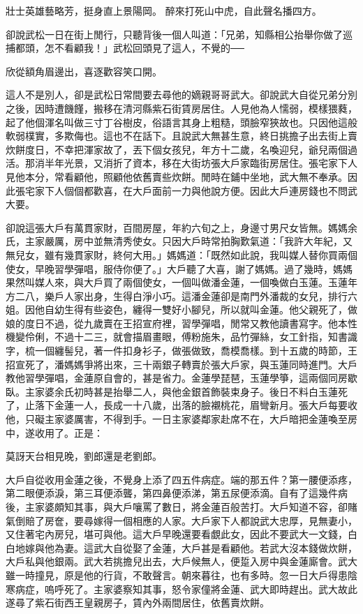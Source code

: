 \begin{showcontents}{}
壯士英雄藝略芳，挺身直上景陽岡。
醉來打死山中虎，自此聲名播四方。

卻說武松一日在街上閒行，只聽背後一個人叫道：「兄弟，知縣相公抬舉你做了巡捕都頭，怎不看顧我！」武松回頭見了這人，不覺的──

欣從額角眉邊出，喜逐歡容笑口開。

這人不是別人，卻是武松日常間要去尋他的嫡親哥哥武大。卻說武大自從兄弟分別之後，因時遭饑饉，搬移在清河縣紫石街賃房居住。人見他為人懦弱，模樣猥蕤，起了他個渾名叫做三寸丁谷樹皮，俗語言其身上粗糙，頭臉窄狹故也。只因他這般軟弱樸實，多欺侮也。這也不在話下。且說武大無甚生意，終日挑擔子出去街上賣炊餅度日，不幸把渾家故了，丟下個女孩兒，年方十二歲，名喚迎兒，爺兒兩個過活。那消半年光景，又消折了資本，移在大街坊張大戶家臨街房居住。張宅家下人見他本分，常看顧他，照顧他依舊賣些炊餅。閒時在鋪中坐地，武大無不奉承。因此張宅家下人個個都歡喜，在大戶面前一力與他說方便。因此大戶連房錢也不問武大要。

卻說這張大戶有萬貫家財，百間房屋，年約六旬之上，身邊寸男尺女皆無。媽媽余氏，主家嚴厲，房中並無清秀使女。只因大戶時常拍胸歎氣道：「我許大年紀，又無兒女，雖有幾貫家財，終何大用。」媽媽道：「既然如此說，我叫媒人替你買兩個使女，早晚習學彈唱，服侍你便了。」大戶聽了大喜，謝了媽媽。過了幾時，媽媽果然叫媒人來，與大戶買了兩個使女，一個叫做潘金蓮，一個喚做白玉蓮。玉蓮年方二八，樂戶人家出身，生得白淨小巧。這潘金蓮卻是南門外潘裁的女兒，排行六姐。因他自幼生得有些姿色，纏得一雙好小腳兒，所以就叫金蓮。他父親死了，做娘的度日不過，從九歲賣在王招宣府裡，習學彈唱，閒常又教他讀書寫字。他本性機變伶俐，不過十二三，就會描眉畫眼，傅粉施朱，品竹彈絲，女工針指，知書識字，梳一個纏髻兒，著一件扣身衫子，做張做致，喬模喬樣。到十五歲的時節，王招宣死了，潘媽媽爭將出來，三十兩銀子轉賣於張大戶家，與玉蓮同時進門。大戶教他習學彈唱，金蓮原自會的，甚是省力。金蓮學琵琶，玉蓮學箏，這兩個同房歇臥。主家婆余氏初時甚是抬舉二人，與他金銀首飾裝束身子。後日不料白玉蓮死了，止落下金蓮一人，長成一十八歲，出落的臉襯桃花，眉彎新月。張大戶每要收他，只礙主家婆厲害，不得到手。一日主家婆鄰家赴席不在，大戶暗把金蓮喚至房中，遂收用了。正是：

莫訝天台相見晚，劉郎還是老劉郎。

大戶自從收用金蓮之後，不覺身上添了四五件病症。端的那五件？第一腰便添疼，第二眼便添淚，第三耳便添聾，第四鼻便添涕，第五尿便添滴。自有了這幾件病後，主家婆頗知其事，與大戶嚷罵了數日，將金蓮百般苦打。大戶知道不容，卻賭氣倒賠了房奩，要尋嫁得一個相應的人家。大戶家下人都說武大忠厚，見無妻小，又住著宅內房兒，堪可與他。這大戶早晚還要看覷此女，因此不要武大一文錢，白白地嫁與他為妻。這武大自從娶了金蓮，大戶甚是看顧他。若武大沒本錢做炊餅，大戶私與他銀兩。武大若挑擔兒出去，大戶候無人，便踅入房中與金蓮廝會。武大雖一時撞見，原是他的行貨，不敢聲言。朝來暮往，也有多時。忽一日大戶得患陰寒病症，嗚呼死了。主家婆察知其事，怒令家僮將金蓮、武大即時趕出。武大故此遂尋了紫石街西王皇親房子，賃內外兩間居住，依舊賣炊餅。


\end{showcontents}
